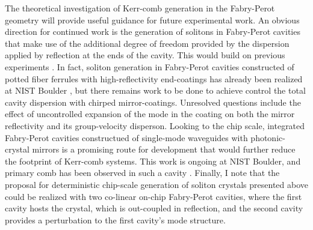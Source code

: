 The theoretical investigation of Kerr-comb generation in the Fabry-Perot geometry will provide useful guidance for future experimental work. An obvious direction for continued work is the generation of solitons in Fabry-Perot cavities that make use of the additional degree of freedom provided by the dispersion applied by reflection at the ends of the cavity. This would build on previous experiments \cite{Braje2009,Obrzud2017}. In fact, soliton generation in Fabry-Perot cavities constructed of potted fiber ferrules with high-reflectivity end-coatings has already been realized at NIST Boulder \cite{Zhang2018}, but there remains work to be done to achieve control the total cavity dispersion with chirped mirror-coatings. Unresolved questions include the effect of uncontrolled expansion of the mode in the coating on both the mirror reflectivity and its group-velocity disperson. Looking to the chip scale, integrated Fabry-Perot cavities constructued of single-mode waveguides with photonic-crystal mirrors is a promising route for development that would further reduce the footprint of Kerr-comb systems. This work is ongoing at NIST Boulder, and primary comb has been observed in such a cavity \cite{Yu2018}. Finally, I note that the proposal for deterministic chip-scale generation of soliton crystals presented above could be realized with two co-linear on-chip Fabry-Perot cavities, where the first cavity hosts the crystal, which is out-coupled in reflection, and the second cavity provides a perturbation to the first cavity's mode structure.







